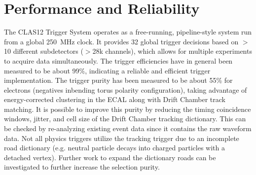 \section{Performance and Reliability}

The CLAS12 Trigger System operates as a free-running, pipeline-style system run from a global 250~MHz
clock. It provides 32 global trigger decisions based on $>$10 different subdetectors ($>$28k channels), which
allows for multiple experiments to acquire data simultaneously. The trigger efficiencies have in general been
measured to be about 99\%, indicating a reliable and efficient trigger implementation. The trigger purity has
been measured to be about 55\% for electrons (negatives inbending torus polarity configuration), taking
advantage of energy-corrected clustering in the ECAL along with Drift Chamber track matching. It is possible
to improve this purity by reducing the timing coincidence windows, jitter, and cell size of the Drift Chamber
tracking dictionary. This can be checked by re-analyzing existing event data since it contains the raw waveform
data. Not all physics triggers utilize the tracking trigger due to an incomplete road dictionary (e.g. neutral
particle decays into charged particles with a detached vertex). Further work to expand the dictionary roads
can be investigated to further increase the selection purity.
